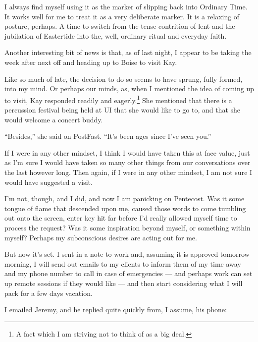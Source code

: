 I always find myself using it as the marker of slipping back into Ordinary Time. It works well for me to treat it as a very deliberate marker. It is a relaxing of posture, perhaps. A time to switch from the tense contrition of lent and the jubilation of Eastertide into the, well, ordinary ritual and everyday faith.

Another interesting bit of news is that, as of last night, I appear to be taking the week after next off and heading up to Boise to visit Kay.

Like so much of late, the decision to do so seems to have sprung, fully formed, into my mind. Or perhaps our minds, as, when I mentioned the idea of coming up to visit, Kay responded readily and eagerly.\footnote{A fact which I am striving not to think of as a big deal.} She mentioned that there is a percussion festival being held at UI that she would like to go to, and that she would welcome a concert buddy.

``Besides,'' she said on PostFast. ``It's been ages since I've seen you.''

If I were in any other mindset, I think I would have taken this at face value, just as I'm sure I would have taken so many other things from our conversations over the last however long. Then again, if I were in any other mindset, I am not sure I would have suggested a visit.

I'm not, though, and I did, and now I am panicking on Pentecost. Was it some tongue of flame that descended upon me, caused those words to come tumbling out onto the screen, enter key hit far before I'd really allowed myself time to process the request? Was it some inspiration beyond myself, or something within myself? Perhaps my subconscious desires are acting out for me.

But now it's set. I sent in a note to work and, assuming it is approved tomorrow morning, I will send out emails to my clients to inform them of my time away and my phone number to call in case of emergencies --- and perhaps work can set up remote sessions if they would like --- and then start considering what I will pack for a few days vacation.

I emailed Jeremy, and he replied quite quickly from, I assume, his phone:

